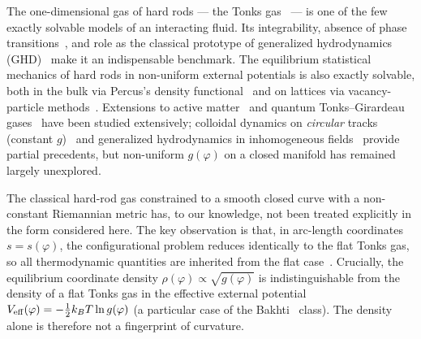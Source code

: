 \documentclass[aps,pre,twocolumn,superscriptaddress,longbibliography,floatfix]{revtex4-2}
\begin{document}
The one-dimensional gas of hard rods — the Tonks gas~\cite{Tonks1936} — is one of the few
exactly solvable models of an interacting fluid.
Its integrability, absence of phase transitions~\cite{vanHove1950}, and role as the classical
prototype of generalized hydrodynamics (GHD)~\cite{CastroDoyonYoshimura2016,BertiniCollura2016,DoyonYoshimuraCaux2018}
make it an indispensable benchmark.
The equilibrium statistical mechanics of hard rods in non-uniform external
potentials is also exactly solvable, both in the bulk via Percus's
density functional~\cite{Percus1976} and on lattices via vacancy-particle
methods~\cite{Bakhti2015}.
Extensions to active matter~\cite{SchiltzRouse2023} and quantum Tonks--Girardeau
gases~\cite{Girardeau1960,TononiSalasnich2023} have been studied extensively;
colloidal dynamics on \emph{circular} tracks (constant
$g$)~\cite{CastroVillarrealRamirez2021,CastroVillarreal2023} and generalized hydrodynamics
in inhomogeneous fields~\cite{DoyonInhomGHD2017} provide partial precedents, but
non-uniform $g(\varphi)$ on a closed manifold has remained largely unexplored.

The classical hard-rod gas constrained to a smooth closed curve with a non-constant
Riemannian metric has, to our knowledge, not been treated explicitly in the form
considered here.
The key observation is that, in arc-length coordinates $s=s(\varphi)$, the configurational
problem reduces identically to the flat Tonks gas, so all thermodynamic quantities are
inherited from the flat case~\cite{Tonks1936,vanHove1950,CuestaGHD2004}.
Crucially, the equilibrium coordinate density $\rho(\varphi)\propto\sqrt{g(\varphi)}$ is
indistinguishable from the density of a flat Tonks gas in the effective external potential
$V_{\rm eff}(\varphi) = -\tfrac{1}{2}k_BT\ln g(\varphi)$ (a particular case of the
Bakhti~\cite{Bakhti2015} class).
The density alone is therefore not a fingerprint of curvature.
\end{document}
